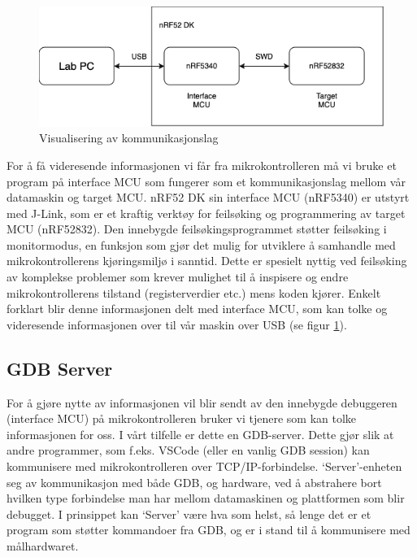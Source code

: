 \begin{figure}[ht]
    \centering
    \includegraphics[scale=0.60]{figures/nrf52_debug_swd.png}
    \caption{Visualisering av kommunikasjonslag}
    \label{fig:debugging_swd}
\end{figure}


For å få videresende informasjonen vi får fra mikrokontrolleren må vi bruke et program på interface MCU som fungerer som et kommunikasjonslag mellom vår datamaskin og target MCU. nRF52 DK sin interface MCU (nRF5340) er utstyrt med J-Link, som er et kraftig verktøy for feilsøking og programmering av target MCU (nRF52832). Den innebygde feilsøkingsprogrammet støtter feilsøking i monitormodus, en funksjon som gjør det mulig for utviklere å samhandle med mikrokontrollerens kjøringsmiljø i sanntid. Dette er spesielt nyttig ved feilsøking av komplekse problemer som krever mulighet til å inspisere og endre mikrokontrollerens tilstand (registerverdier etc.) mens koden kjører. Enkelt forklart blir denne informasjonen delt med interface MCU, som kan tolke og videresende informasjonen over til vår maskin over USB (se figur \ref{fig:debugging_swd}). 


\subsection{GDB Server}

For å gjøre nytte av informasjonen vil blir sendt av den innebygde debuggeren (interface MCU) på mikrokontrolleren bruker vi tjenere som kan tolke informasjonen for oss. I vårt tilfelle er dette en GDB-server. Dette gjør slik at andre programmer, som f.eks. VSCode (eller en vanlig GDB session) kan kommunisere med mikrokontrolleren over TCP/IP-forbindelse. `Server'-enheten seg av kommunikasjon med både GDB, og hardware, ved å abstrahere bort hvilken type forbindelse man har mellom datamaskinen og plattformen som blir debugget. I prinsippet kan `Server' være hva som helst, så lenge det er et program som støtter kommandoer fra GDB, og er i stand til å kommunisere med målhardwaret. 



